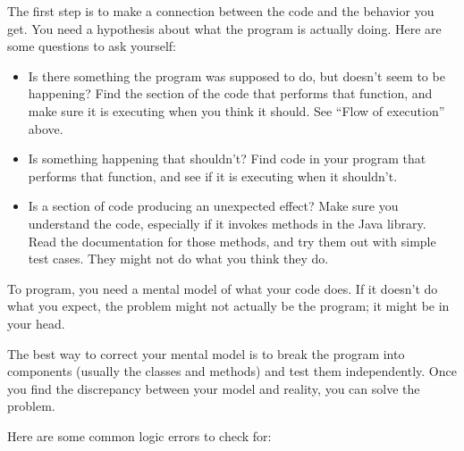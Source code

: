 \documentclass[12pt]{book}
\theoremstyle{exercise}
\begin{document}
The first step is to make a connection between the code and the behavior you get.
You need a hypothesis about what the program is actually doing.
Here are some questions to ask yourself:

\begin{itemize}

\item Is there something the program was supposed to do, but doesn't seem to be happening?
Find the section of the code that performs that function, and make sure it is executing when you think it should.
See ``Flow of execution'' above.

\item Is something happening that shouldn't?
Find code in your program that performs that function, and see if it is executing when it shouldn't.

\item Is a section of code producing an unexpected effect?
Make sure you understand the code, especially if it invokes methods in the Java library.
Read the documentation for those methods, and try them out with simple test cases.
They might not do what you think they do.

\end{itemize}

To program, you need a mental model of what your code does.
If it doesn't do what you expect, the problem might not actually be the program; it might be in your head.


The best way to correct your mental model is to break the program into components (usually the classes and methods) and test them independently.
Once you find the discrepancy between your model and reality, you can solve the problem.

Here are some common logic errors to check for:
\end{document}
